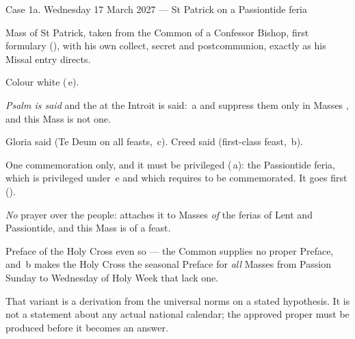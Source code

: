 \begin{casebox}{Case 1a. Wednesday 17 March 2027 --- St Patrick on a
Passiontide feria}
\begin{substeps}
\item Mass of St Patrick, taken from the Common of a Confessor Bishop, first
formulary (), with his own collect, secret and postcommunion,
exactly as his Missal entry directs.
\item Colour white (\,e).
\item \emph{Psalm  is said} and the  at
the Introit is said: \,a and  suppress them only in Masses
, and this Mass is not one.
\item Gloria said (Te Deum on all feasts, \,c). Creed said (first-class
feast, \,b).
\item One commemoration only, and it must be privileged (\,a): the
Passiontide feria, which is privileged under \,e and which 
requires to be commemorated. It goes first ().
\item \emph{No} prayer over the people:  attaches it to Masses
\emph{of} the ferias of Lent and Passiontide, and this Mass is of a feast.
\item Preface of the Holy Cross even so --- the Common supplies no proper
Preface, and \,b makes the Holy Cross the seasonal Preface for
\emph{all} Masses from Passion Sunday to Wednesday of Holy Week that lack one.
\end{substeps}

\noindent
That variant is a derivation from the universal norms on a stated hypothesis.
It is not a statement about any actual national calendar; the approved proper
must be produced before it becomes an answer.
\end{casebox}

